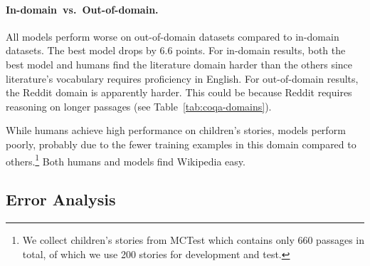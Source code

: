 \paragraph{In-domain~vs.~Out-of-domain.}
All models perform worse on out-of-domain datasets compared to in-domain datasets. The best model drops by 6.6 points. For in-domain results, both the best model and humans find the literature domain harder than the others since literature's vocabulary requires proficiency in English. For out-of-domain results, the Reddit domain is apparently harder. This could be because Reddit requires reasoning on longer passages (see Table~\ref{tab:coqa-domains}).

While humans achieve high performance on children's stories,  models perform poorly, probably due to the fewer training examples in this domain compared to others.\footnote{We collect children's stories from MCTest which contains only 660 passages in total, of which we use 200 stories for development and test.}
Both humans and models find Wikipedia easy.

\subsection{Error Analysis}


